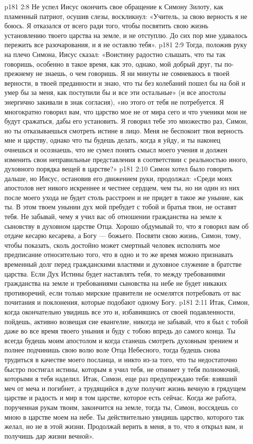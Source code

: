 \vs p181 2:8 Не успел Иисус окончить свое обращение к Симону Зилоту, как пламенный патриот, осушив слезы, воскликнул: «Учитель, за свою верность я не боюсь. Я отказался от всего ради того, чтобы посвятить свою жизнь установлению твоего царства на земле, и не отступлю. До сих пор мне удавалось пережить все разочарования, и я не оставлю тебя».
\vs p181 2:9 Тогда, положив руку на плечо Симона, Иисус сказал: «Воистину радостно слышать, что ты так говоришь, особенно в такое время, как это, однако, мой добрый друг, ты по\hyp{}прежнему не знаешь, о чем говоришь. Я ни минуты не сомневаюсь в твоей верности, в твоей преданности и знаю, что ты без колебаний пошел бы на бой и умер бы за меня, как поступили бы и все эти остальные» (и все апостолы энергично закивали в знак согласия), «но этого от тебя не потребуется. Я многократно говорил вам, что царство мое не от мира сего и что ученики мои не будут сражаться, дабы его установить. Я говорил тебе это множество раз, Симон, но ты отказываешься смотреть истине в лицо. Меня не беспокоит твоя верность мне и царству, однако что ты будешь делать, когда я уйду, и ты наконец очнешься и осознаешь, что не сумел понять смысл моего учения и должен изменить свои неправильные представления в соответствии с реальностью иного, духовного порядка вещей в царстве?»
\vs p181 2:10 Симон хотел было говорить дальше, но Иисус, остановив его движением руки, продолжал: «Среди моих апостолов нет никого искреннее и честнее сердцем, чем ты, но ни один из них после моего ухода не будет столь расстроен и не придет в такое же уныние, как ты. В этом твоем унынии дух мой пребудет с тобой и братья твои, не оставят тебя. Не забывай, чему я учил вас об отношении гражданства на земле к сыновству в духовном царстве Отца. Хорошо обдумывай то, что я говорил вам об отдаче кесарю кесарева, а Богу --- божьего. Посвяти свою жизнь, Симон, тому, чтобы показать, сколь достойно может смертный человек исполнять мое предписание относительно того, что в одно и то же время можно признавать временный долг перед гражданскими властями и духовное служение в братстве царства. Если Дух Истины будет наставлять тебя, то между требованиями гражданства на земле и требованиями сыновства на небе не будет никаких противоречий, если только мирские правители не осмелятся потребовать от вас почитания и поклонения, которые подобают одному Богу.
\vs p181 2:11 \pc Итак, Симон, когда окончательно увидишь все это и, избавившись от своей подавленности, пойдешь, активно возвещая сие евангелие, никогда не забывай, что я был с тобой даже во все время твоего уныния и буду с тобою впредь до самого конца. Ты всегда будешь моим апостолом и когда станешь смотреть духовным зрением и полнее подчинишь свою волю воле Отца Небесного, тогда будешь снова трудиться в качестве моего посланца, и никто из\hyp{}за того, что ты недостаточно быстро постигал истины, которым я учил тебя, не отнимет у тебя полномочий, которыми я тебя наделил. Итак, Симон, еще раз предупреждаю тебя: взявший меч от меча и погибнет, а трудящийся в духе получит жизнь вечную в грядущем царстве и радость и мир в том царстве, которое есть сейчас. Когда же работа, порученная рукам твоим, закончится на земле, тогда ты, Симон, воссядешь со мною в царстве моем на небе. Ты действительно увидишь царство, которого так желал, но не в этой жизни. Продолжай верить в меня, в то, что я открыл вам, и получишь дар жизни вечной».
